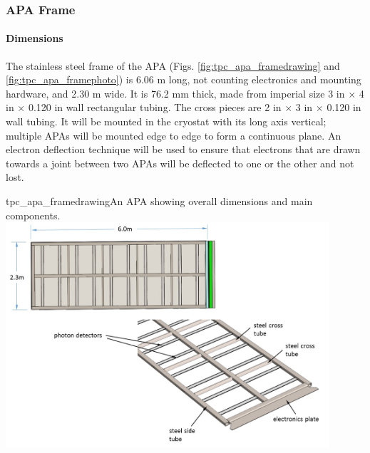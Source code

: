 \subsubsection{APA Frame}


\paragraph{Dimensions}

The stainless steel frame of the APA (Figs. \ref{fig:tpc_apa_framedrawing} and \ref{fig:tpc_apa_framephoto}) is 6.06 m long, not counting electronics and mounting hardware, and 2.30 m wide.  It is 76.2 mm thick, made from imperial size 3 in $\times$ 4 in $\times$ 0.120 in wall rectangular tubing.  The cross pieces are 2 in $\times$ 3 in $\times$ 0.120 in wall tubing.  It will be mounted in the cryostat with its long axis vertical; multiple APAs will be mounted edge to edge to form a continuous plane. An electron deflection technique will be used to ensure that electrons that are drawn towards a joint between two APAs will be deflected to one or the other and not lost.

\begin{cdrfigure}{tpc_apa_framedrawing}{An APA showing overall dimensions and main components.}
\includegraphics[width=0.9\textwidth]{figures/tpc_apa_framedrawing.png} 
\end{cdrfigure}


